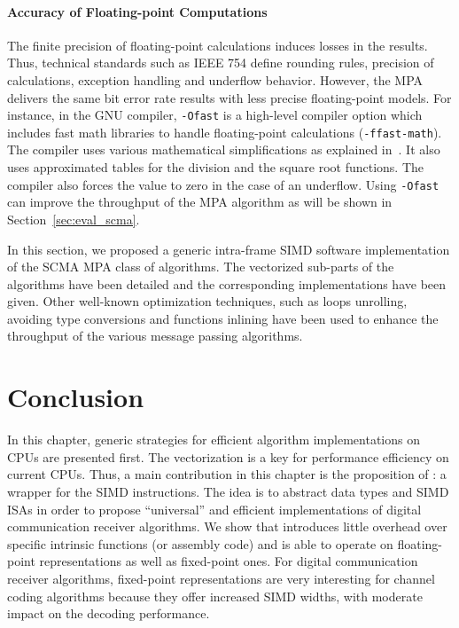 \newpage
\paragraph{Accuracy of Floating-point Computations}
\label{sec:opt_scma_float}

The finite precision of floating-point calculations induces losses in the
results. Thus, technical standards such as IEEE 754 define rounding rules,
precision of calculations, exception handling and underflow behavior. However,
the MPA delivers the same bit error rate results with less precise
floating-point models. For instance, in the GNU compiler, \verb|-Ofast| is a
high-level compiler option which includes fast math libraries to handle
floating-point calculations (\verb|-ffast-math|). The compiler uses various
mathematical simplifications as explained in~\cite{Gccfp2018}. It also uses
approximated tables for the division and the square root functions. The compiler
also forces the value to zero in the case of an underflow. Using \verb|-Ofast|
can improve the throughput of the MPA algorithm as will be shown in
Section~\ref{sec:eval_scma}.

In this section, we proposed a generic intra-frame SIMD software implementation
of the SCMA MPA class of algorithms. The vectorized sub-parts of the algorithms
have been detailed and the corresponding \MIPP implementations have been given.
Other well-known optimization techniques, such as loops unrolling, avoiding type
conversions and functions inlining have been used to enhance the throughput of
the various message passing algorithms.

\section{Conclusion}

In this chapter, generic strategies for efficient algorithm implementations on
CPUs are presented first. The vectorization is a key for performance efficiency
on current CPUs. Thus, a main contribution in this chapter is the proposition of
\MIPP: a wrapper for the SIMD instructions. The idea is to abstract data types
and SIMD ISAs in order to propose ``universal'' and efficient implementations of
digital communication receiver algorithms. We show that \MIPP introduces little
overhead over specific intrinsic functions (or assembly code) and is able to
operate on floating-point representations as well as fixed-point ones. For
digital communication receiver algorithms, fixed-point representations are very
interesting for channel coding algorithms because they offer increased SIMD
widths, with moderate impact on the decoding performance.

